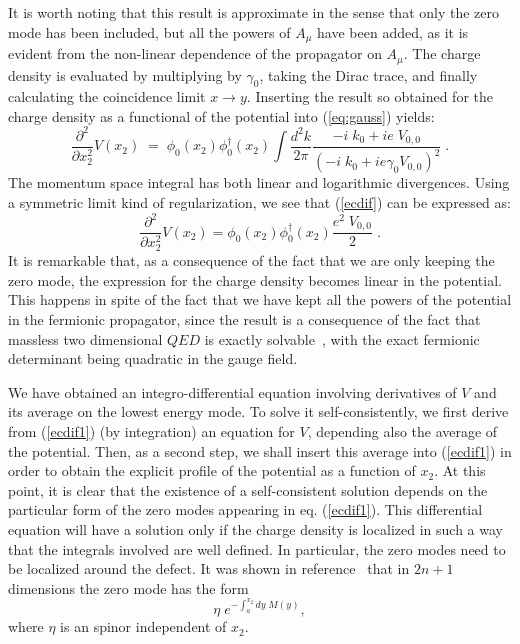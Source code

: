 \documentclass[a4paper,12pt]{article}
\begin{document}
{{It is worth noting that this result is approximate in the sense that
only the zero mode has been included, but all the powers of $A_\mu$
have been added, as it is evident from the non-linear dependence of
the propagator on $A_\mu$.  The charge density is evaluated by
multiplying by $\gamma_0$, taking the Dirac trace, and finally
calculating the coincidence limit $x \to y$. Inserting the result so
obtained for the charge density as a functional of the potential into
(\ref{eq:gauss}) yields:
\begin{equation}
   \label{ecdif}
\frac{\partial^2}{\partial x_2^2}V(x_2)\;=\; \phi_0(x_2)\phi^{\dagger}_0(x_2) \int \frac{d^2k}{2\pi}
\frac{-i\;k_0+ie\;V_{0,0}}{(-i\;k_0+ie \gamma_0 V_{0,0})^2}\;.
\end{equation}
The momentum space integral has both linear and logarithmic
divergences. Using a symmetric limit kind of regularization, we see
that (\ref{ecdif}) can be expressed as:
\begin{equation}
   \label{ecdif1}
\frac{\partial^2}{\partial x_2^2}V(x_2) =
\phi_0(x_2)\phi^{\dagger}_0(x_2)\frac{e^2\;V_{0,0}}{2}\;.
\end{equation}
It is remarkable that, as a consequence of the fact that we are only
keeping the zero mode, the expression for the charge density becomes
linear in the potential. This happens in spite of the fact that we
have kept all the powers of the potential in the fermionic propagator,
since the result is a consequence of the fact that massless two
dimensional $QED$ is exactly solvable~\cite{sch}, with the exact
fermionic determinant being quadratic in the gauge field.

We have obtained an integro-differential equation involving
derivatives of $V$ and its average on the lowest energy mode. To solve
it self-consistently, we first derive from (\ref{ecdif1}) (by
integration) an equation for $V$, depending also the average of the
potential. Then, as a second step, we shall insert this average into
(\ref{ecdif1}) in order to obtain the explicit profile of the
potential as a function of $x_2$.  At this point, it is clear that the
existence of a self-consistent solution depends on the particular form
of the zero modes appearing in eq.  (\ref{ecdif1}). This differential
equation will have a solution only if the charge density is localized
in such a way that the integrals involved are well defined. In
particular, the zero modes need to be localized around the defect.  It
was shown in reference~\cite{ch} that in $2n+1$ dimensions the zero
mode has the form
\begin{equation}
\eta\;e^{-\int_a^{x_2}dy\;M(y)},\label{kallan}
\end{equation}
where $\eta$ is an spinor independent of $x_2$.
}}
\end{document}
